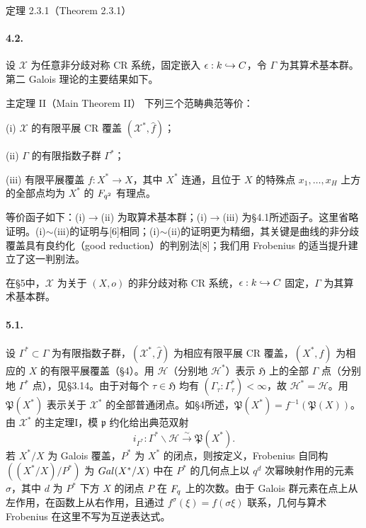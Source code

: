 \begin{originaltheorem}{定理 2.3.1（Theorem 2.3.1）}
\paragraph*{4.2.}
设 $\mathcal X$ 为任意非分歧对称 CR 系统，固定嵌入 $\epsilon:k\hookrightarrow C$，令 $\Gamma$ 为其算术基本群。第二 Galois 理论的主要结果如下。
\begin{originaltheorem}{主定理 II（Main Theorem II）}
下列三个范畴典范等价：

(i) $\mathcal X$ 的有限平展 CR 覆盖 $(\mathcal X^*,\widehat f)$；

(ii) $\Gamma$ 的有限指数子群 $\Gamma^*$；

(iii) 有限平展覆盖 $f:X^*\longrightarrow X$，其中 $X^*$ 连通，且位于 $X$ 的特殊点 $x_1,\ldots,x_H$ 上方的全部点均为 $X^*$ 的 $F_{q^2}$ 有理点。
\end{originaltheorem}
等价函子如下：(i)$\longrightarrow$(ii) 为取算术基本群；(i)$\longrightarrow$(iii) 为§4.1所述函子。这里省略证明。(i)$\sim$(iii)的证明与[6]相同；(i)$\sim$(ii)的证明更为精细，其关键是曲线的非分歧覆盖具有良约化（good reduction）的判别法[8]；我们用 Frobenius 的适当提升建立了这一判别法。

在§5中，$\mathcal X$ 为关于 $(X,o)$ 的非分歧对称 CR 系统，$\epsilon:k\hookrightarrow C$ 固定，$\Gamma$ 为其算术基本群。

\paragraph*{5.1.}
设 $\Gamma^*\subset\Gamma$ 为有限指数子群，$(\mathcal X^*,\widehat f)$ 为相应有限平展 CR 覆盖，$(X^*,f)$ 为相应的 $X$ 的有限平展覆盖（§4）。用 $\mathcal H$（分别地 $\mathcal H^*$）表示 $\mathfrak H$ 上的全部 $\Gamma$ 点（分别地 $\Gamma^*$ 点），见§3.14。由于对每个 $\tau\in\mathfrak H$ 均有 $(\Gamma_\tau:\Gamma_\tau^*)<\infty$，故 $\mathcal H^*=\mathcal H$。用 $\mathfrak P(X^*)$ 表示关于 $\mathcal X^*$ 的全部普通闭点。如§4所述，$\mathfrak P(X^*)=f^{-1}(\mathfrak P(X))$。由 $\mathcal X^*$ 的主定理I，模 $\mathfrak p$ 约化给出典范双射
\[
 i_{\Gamma^*}:\Gamma^*\backslash\mathcal H\xrightarrow{\sim}\mathfrak P(X^*).\tag{5.1.1}
\]
若 $X^*/X$ 为 Galois 覆盖，$P^*$ 为 $X^*$ 的闭点，则按定义，Frobenius 自同构 $((X^*/X)/P^*)$ 为 $Gal(X^*/X)$ 中在 $P^*$ 的几何点上以 $q^d$ 次幂映射作用的元素 $\sigma$，其中 $d$ 为 $P^*$ 下方 $X$ 的闭点 $P$ 在 $F_q$ 上的次数。由于 Galois 群元素在点上从左作用，在函数上从右作用，且通过 $f^\sigma(\xi)=f(\sigma\xi)$ 联系，几何与算术 Frobenius 在这里不写为互逆表达式。


\end{originaltheorem}

